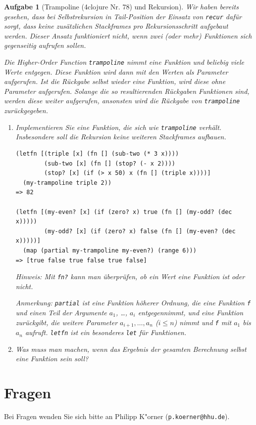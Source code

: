 \documentclass[11pt,a4paper]{article}
\newcounter{numb}
\theoremstyle{break}
\newtheorem{aufgabe}{Aufgabe}[numb]
\begin{document}
\begin{aufgabe}[Trampoline (4clojure Nr. 78) und Rekursion]
Wir haben bereits gesehen, dass bei Selbstrekursion in Tail-Position
der Einsatz von \verb|recur| daf\"ur sorgt, dass keine zus\"atzlichen Stackframes
pro Rekursionsschritt aufgebaut werden.
Dieser Ansatz funktioniert nicht, wenn zwei (oder mehr) Funktionen sich gegenseitig
aufrufen sollen.

Die Higher-Order Function \verb|trampoline| nimmt eine Funktion
und beliebig viele Werte entgegen.
Diese Funktion wird dann mit den Werten als Parameter aufgerufen.
Ist die R\"uckgabe selbst wieder eine Funktion, wird diese ohne Parameter aufgerufen.
Solange die so resultierenden R\"uckgaben Funktionen sind, werden diese weiter aufgerufen,
ansonsten wird die R\"uckgabe von \verb|trampoline| zur\"uckgegeben.

\begin{enumerate}[label=\alph*)]
    \item
Implementieren Sie eine Funktion, die sich wie \verb|trampoline| verh\"alt.
Insbesondere soll die Rekursion keine weiteren Stackframes aufbauen.

\begin{verbatim}
(letfn [(triple [x] (fn [] (sub-two (* 3 x))))
        (sub-two [x] (fn [] (stop? (- x 2))))
        (stop? [x] (if (> x 50) x (fn [] (triple x))))]
  (my-trampoline triple 2))
=> 82

(letfn [(my-even? [x] (if (zero? x) true (fn [] (my-odd? (dec x)))))
        (my-odd? [x] (if (zero? x) false (fn [] (my-even? (dec x)))))]
  (map (partial my-trampoline my-even?) (range 6)))
=> [true false true false true false]
\end{verbatim}

Hinweis:
Mit \verb|fn?| kann man \"uberpr\"ufen, ob ein Wert eine Funktion ist oder nicht.

Anmerkung: \verb|partial| ist eine Funktion h\"oherer Ordnung,
die eine Funktion \verb|f| und einen Teil der Argumente $a_1$, \dots, $a_i$
entgegennimmt, und eine Funktion zur\"uckgibt, die weitere Parameter $a_{i+1}, \dots, a_n$ ($i \leq n$) nimmt
und \verb|f| mit $a_1$ bis $a_n$ aufruft.
\verb|letfn| ist ein besonderes \verb|let| f\"ur Funktionen.

\item Was muss man machen, wenn das Ergebnis der gesamten Berechnung selbst eine Funktion sein soll?
\end{enumerate}

\end{aufgabe}

\section*{Fragen}
Bei Fragen wenden Sie sich bitte an Philipp K"orner (\texttt{p.koerner@hhu.de}).
\end{document}
